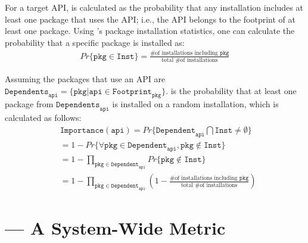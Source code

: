 \noindent
For a target API, \usagemetric{} is calculated as the probability
that any installation includes
at least one package that uses the API;
i.e.,
the API belongs to the footprint of at least one package.
Using \osdist{}'s package installation statistics, one can calculate the
probability that a specific package is installed as:
\begin{align*}
Pr\{\mathtt{pkg} \in \mathtt{Inst}\} = \frac{\text{\# of installations including $\mathtt{pkg}$}}{\text{total \# of installations}}
\end{align*}

\noindent
Assuming the packages that use an API are  
$\mathtt{Dependents}_\mathtt{api} = \{\mathtt{pkg}|\mathtt{api} \in \mathtt{Footprint}_\mathtt{pkg}\}$.
\Usagemetric{} is the probability that at least one package
from $\mathtt{Dependents}_\mathtt{api}$ is installed on a random installation, which is calculated as follows:
\begin{align*}
&\mathtt{Importance}(\mathtt{api}) = Pr\{\mathtt{Dependent}_\mathtt{api} \bigcap \mathtt{Inst} \neq \emptyset\} \\
&= 1 - Pr\{\forall \mathtt{pkg} \in \mathtt{Dependent}_\mathtt{api}, \mathtt{pkg} \notin \mathtt{Inst}\} \\
&= 1 - \prod_{\mathtt{pkg} \in \mathtt{Dependent}_\mathtt{api}} Pr\{\mathtt{pkg} \notin \mathtt{Inst}\} \\
&= 1 - \prod_{\mathtt{pkg} \in \mathtt{Dependent}_\mathtt{api}} (1 - \frac{\text{\# of installations including $\mathtt{pkg}$}}{\text{total \# of installations}})
\end{align*}

\section{\CompatMetric{} --- A System-Wide Metric}
\label{sec:defs:compatmetric}



